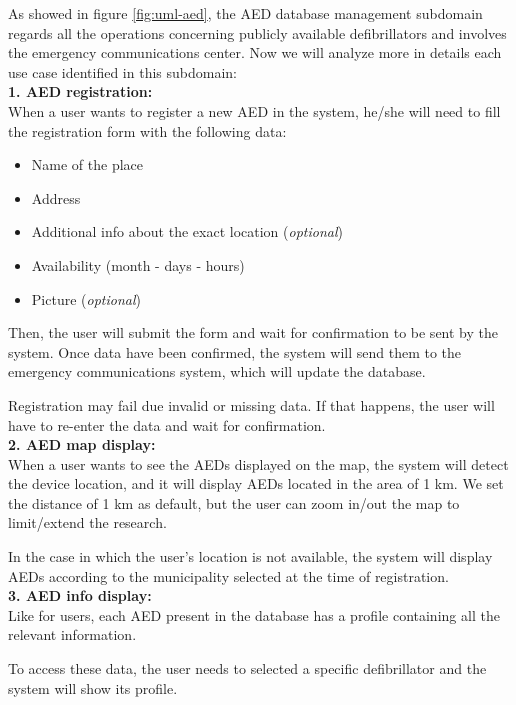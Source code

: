 \documentclass[11pt,a4paper]{article}
\begin{document}
As showed in figure \ref{fig:uml-aed}, the AED database management subdomain regards all the operations concerning publicly available defibrillators and involves the emergency communications center.
%
Now we will analyze more in details each use case identified in this subdomain: \\

\textbf{1. AED registration:} \\

When a user wants to register a new AED in the system, he/she will need to fill the registration form with the following data:

\begin{itemize}
    \item Name of the place
    \item Address
    \item Additional info about the exact location (\textit{optional})
    \item Availability (month - days - hours)
    \item Picture (\textit{optional})
\end{itemize}

Then, the user will submit the form and wait for confirmation to be sent by the system.
%
Once data have been confirmed, the system will send them to the emergency communications system, which will update the database.

Registration may fail due invalid or missing data.
%
If that happens, the user will have to re-enter the data and wait for confirmation. \\

\textbf{2. AED map display:} \\

When a user wants to see the AEDs displayed on the map, the system will detect the device location, and it will display AEDs located in the area of 1 km.
%
We set the distance of 1 km as default, but the user can zoom in/out the map to limit/extend the research.

In the case in which the user's location is not available, the system will display AEDs according to the municipality selected at the time of registration. \\

\textbf{3. AED info display:} \\

Like for users, each AED present in the database has a profile containing all the relevant information.

To access these data, the user needs to selected a specific defibrillator and the system will show its profile.
\end{document}
